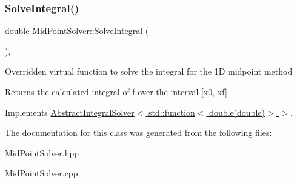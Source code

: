 \subsubsection{\texorpdfstring{Solve\+Integral()}{SolveIntegral()}}
{\footnotesize\ttfamily double Mid\+Point\+Solver\+::\+Solve\+Integral (\begin{DoxyParamCaption}{ }\end{DoxyParamCaption})\hspace{0.3cm}{\ttfamily [override]}, {\ttfamily [virtual]}}

Overridden virtual function to solve the integral for the 1D midpoint method \begin{DoxyReturn}{Returns}
the calculated integral of f over the interval \mbox{[}x0, xf\mbox{]} 
\end{DoxyReturn}


Implements \hyperlink{class_abstract_integral_solver}{Abstract\+Integral\+Solver$<$ std\+::function$<$ double(double)$>$ $>$}.



The documentation for this class was generated from the following files\+:\begin{DoxyCompactItemize}
\item 
Mid\+Point\+Solver.\+hpp\item 
Mid\+Point\+Solver.\+cpp\end{DoxyCompactItemize}
